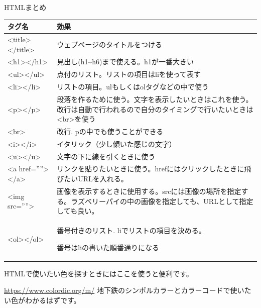 \documentclass[a4paper,12pt,dvipdfmx]{jarticle}
\begin{document}
\clearpage
HTMLまとめ\ \

\begin{center}
	\tablefirsthead{}
	\tablehead{}
	\tabletail{}
	\tablelasttail{}
	\begin{supertabular}{|m{4.0cm}|m{12.0cm}|}
		\hline
		タグ名 &
		効果\\\hline
		{\textless}title{\textgreater}{\textless}/title{\textgreater} &
		ウェブページのタイトルをつける\\\hline
		{\textless}h1{\textgreater}{\textless}/h1{\textgreater} &
		見出し(h1\~{}h6)まで使える。h1が一番大きい\\\hline
		{\textless}ul{\textgreater}{\textless}/ul{\textgreater} &
		点付のリスト。リストの項目はliを使って表す\\\hline
		{\textless}li{\textgreater}{\textless}/li{\textgreater} &
		リストの項目。ulもしくはolタグなどの中で使う\\\hline
		{\textless}p{\textgreater}{\textless}/p{\textgreater} &
		段落を作るために使う。文字を表示したいときはこれを使う。改行は自動で行われるので自分のタイミングで行いたいときは{\textless}br{\textgreater}を使う\\\hline
		{\textless}br{\textgreater} &
		改行. pの中でも使うことができる\\\hline
		{\textless}i{\textgreater}{\textless}/i{\textgreater} &
		イタリック（少し傾いた感じの文字）\\\hline
		{\textless}u{\textgreater}{\textless}/u{\textgreater} &
		文字の下に線を引くときに使う\\\hline
		{\textless}a href=””{\textgreater}{\textless}/a{\textgreater} &
		リンクを貼りたいときに使う。hrefにはクリックしたときに飛びたいURLを入れる。\\\hline
		{\textless}img src=””{\textgreater} &
		画像を表示するときに使用する。srcには画像の場所を指定する。ラズベリーパイの中の画像を指定しても、URLとして指定しても良い。\\\hline
		{\textless}ol{\textgreater}{\textless}/ol{\textgreater} &
		番号付きのリスト.
		liでリストの項目を決める。

		番号はliの書いた順番通りになる\\\hline
	\end{supertabular}
\end{center}

\bigskip

HTMLで使いたい色を探すときにはここを使うと便利です。

\url{https://www.colordic.org/m/}\newline
地下鉄のシンボルカラーとカラーコードで使いたい色がわかるはずです。
\end{document}
